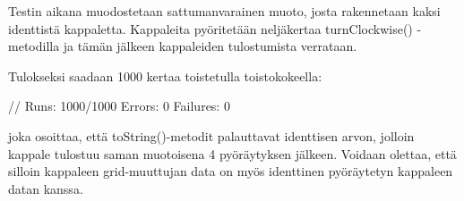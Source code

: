 Testin aikana muodostetaan sattumanvarainen muoto, josta rakennetaan kaksi
identtistä kappaletta. Kappaleita pyöritetään neljäkertaa turnClockwise()
-metodilla ja tämän jälkeen kappaleiden tulostumista verrataan.

Tulokseksi saadaan 1000 kertaa toistetulla toistokokeella:

\begin{javacode}
// Runs: 1000/1000	Errors: 0	Failures:	0
\end{javacode}

joka osoittaa, että toString()-metodit palauttavat identtisen arvon, jolloin
kappale tulostuu saman muotoisena 4 pyöräytyksen jälkeen. Voidaan olettaa, että
silloin kappaleen grid-muuttujan data on myös identtinen pyöräytetyn kappaleen
datan kanssa. 




